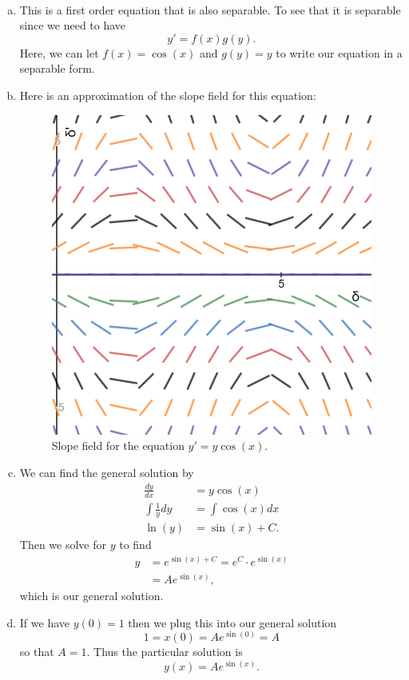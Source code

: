 \documentclass[12pt]{article} %
\begin{document}
\begin{solution}~
\begin{enumerate}[(a)]
    \item This is a first order equation that is also separable. To see that it is separable since we need to have 
    \[
        y' = f(x)g(y).
    \]
    Here, we can let $f(x)=\cos(x)$ and $g(y)=y$ to write our equation in a separable form.
    \item Here is an approximation of the slope field for this equation:
    \begin{figure}[H]
        \centering
        \includegraphics[width=.5\textwidth]{slope_field.png}
        \caption{Slope field for the equation $y'=y\cos(x)$.}
    \end{figure}
    \item We can find the general solution by 
    \begin{align*}
        \frac{dy}{dx}&= y\cos(x)\\
        \int \frac{1}{y}dy &= \int \cos(x)dx\\
        \ln(y)&=\sin(x)+C.
    \end{align*}
    Then we solve for $y$ to find
    \begin{align*}
        y&=e^{\sin(x)+C}=e^C \cdot e^{\sin(x)}\\
        &= Ae^{\sin(x)},
    \end{align*}
    which is our general solution.
    \item If we have $y(0)=1$ then we plug this into our general solution
    \[
    1=x(0)=Ae^{\sin(0)}=A
    \]
    so that $A=1$. Thus the particular solution is
    \[
    \boxed{y(x)=Ae^{\sin(x)}.}
    \]


\end{enumerate}
\end{solution}
\end{document}
